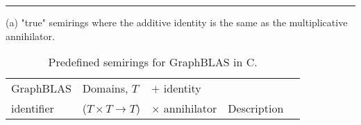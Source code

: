 
\begin{table}
\hrule
\begin{center}
\caption{Predefined semirings for GraphBLAS in C. }
\label{Tab:PredefinedSemirings}
\vspace{1\baselineskip}

(a) "true" semirings where the additive identity is the same as the multiplicative annihilator.
\hspace*{-1.5em}
\begin{tabular}{l|l|l|ll}
GraphBLAS                   & Domains, $T$                  & $+$ identity          & \\
identifier                  & ($T \times T \rightarrow T$)  & $\times$ annihilator   & Description \\ \hline


\end{tabular}
\end{center}
\end{table}
